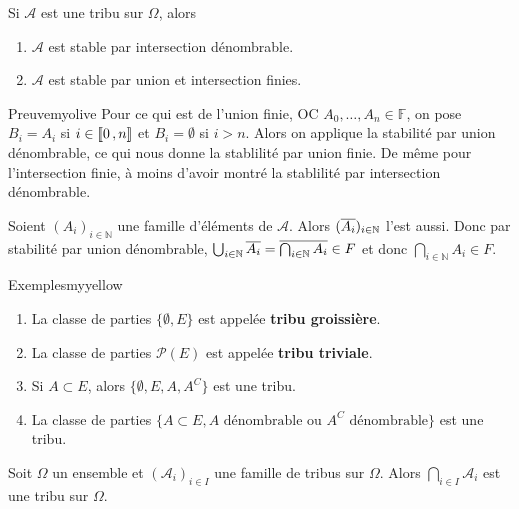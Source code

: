     \begin{prop}{}{}
        Si $\mathcal{A}$ est une tribu sur $\Omega$, alors 
        \begin{enumerate}
            \item $\mathcal{A}$ est stable par intersection dénombrable.
            \item $\mathcal{A}$ est stable par union et intersection finies.
        \end{enumerate}
    \end{prop}

    \begin{demo}{Preuve}{myolive}
        Pour ce qui est de l’union finie, OC $A_0, \ldots, A_n \in \mathbb{F}$, on pose $B_i = A_i$ si $i \in \left\llbracket 0 \, , n \right\rrbracket$ et $B_i = \emptyset$ si $i >n$. Alors on applique la stabilité par union dénombrable, ce qui nous donne la stablilité par union finie. De même pour l’intersection finie, à moins d’avoir montré la stablilité par intersection dénombrable.

        Soient $(A_i)_{i \in \mathbb{N}}$ une famille d’éléments de $\mathcal{A}$. Alors $(\overline{A_i})_{i \in \mathbb{N}}$ l’est aussi. Donc par stabilité par union dénombrable, $\bigcup_{i \in \mathbb{N}} \overline{A_i} = \overline{\bigcap_{i \in \mathbb{N}} A_i} \in F$ et donc $\bigcap_{i \in \mathbb{N}} A_i \in F$.
    \end{demo}

    \begin{omed}{Exemples}{myyellow}
        \begin{enumerate}[label=\textcolor{myyellow}{\arabic*}]
            \item La classe de parties $\{\emptyset, E\}$ est appelée \textbf{tribu groissière}.
            \item La classe de parties $\mathcal{P}(E)$ est appelée \textbf{tribu triviale}.
            \item Si $A \subset E$, alors $\{ \emptyset, E, A, A^{C} \}$ est une tribu.
            \item La classe de parties $\{ A \subset E, A \text{ dénombrable ou } A^{C} \text{ dénombrable}\}$ est une tribu.
        \end{enumerate}
    \end{omed}

    \begin{prop}{}{}
        Soit $\Omega$ un ensemble et $(\mathcal{A}_i)_{i \in I}$ une famille de tribus sur $\Omega$. Alors $\bigcap_{i \in I} \mathcal{A}_i$ est une tribu sur $\Omega$.
    \end{prop}

